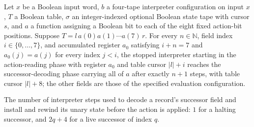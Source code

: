 \begin{lemma}
\label{Turing.timedCut_read_fixed}
\leanok
{}
Let $x$ be a Boolean input word, $b$ a four-tape interpreter configuration on input $x$,
$T$ a Boolean table, $\sigma$ an integer-indexed optional Boolean state tape with
cursor $s$, and $a$ a function assigning a Boolean bit to each of the eight fixed
action-bit positions. Suppose $T=l\,a(0)a(1)\cdots a(7)\,r$. For every
$n\in\mathbb{N}$, field index $i\in\{0,\ldots,7\}$, and accumulated register $a_0$
satisfying $i+n=7$ and $a_0(j)=a(j)$ for every index $j<i$, the stopped interpreter
starting in the action-reading phase with register $a_0$ and table cursor $|l|+i$
reaches the successor-decoding phase carrying all of $a$ after exactly $n+1$ steps, with
table cursor $|l|+8$; the other fields are those of the specified evaluation
configuration.
\end{lemma}

\begin{definition}
\label{Turing.timedCut_NextCost}
\leanok
The number of interpreter steps used to decode a record's successor field and
install and rewind its unary state before the action is applied: $1$ for a
halting successor, and $2q + 4$ for a live successor of index $q$.
\end{definition}

